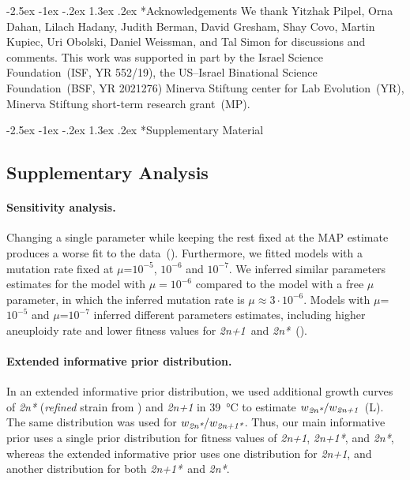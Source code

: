\documentclass[12pt]{extarticle}
\makeatletter
\renewcommand\section{\@startsection {section}{1}{\z@}%
     {-2.5ex \@plus -1ex \@minus -.2ex}%
     {1.3ex \@plus.2ex}%
    {\Large\bfseries}}
\newcommand{\anwt}{\emph{2n+1}}
\newcommand{\eumt}{\emph{2n*}}
\newcommand{\anmt}{\emph{2n+1*}}
\newcommand{\beginsupplement}{%
      	\setcounter{table}{0}
        \renewcommand{\thetable}{S\arabic{table}}%
        \setcounter{figure}{0}
        \renewcommand{\thefigure}{S\arabic{figure}}%
}
\makeatother
\begin{document}

{\small
\section*{Acknowledgements}
We thank Yitzhak Pilpel, Orna Dahan, Lilach Hadany, Judith Berman, David Gresham, Shay Covo, Martin Kupiec, Uri Obolski, Daniel Weissman, and Tal Simon for discussions and comments.
This work was supported in part by 
the Israel Science Foundation~(ISF, YR 552/19),
the US--Israel Binational Science Foundation~(BSF, YR 2021276)
Minerva Stiftung center for Lab Evolution~(YR),
Minerva Stiftung short-term research grant~(MP).
}




\newpage

\section*{Supplementary Material}
\beginsupplement %

\subsection*{Supplementary Analysis}
\label{sec:supp_analysis}

\paragraph{Sensitivity analysis.} 
Changing a single parameter while keeping the rest fixed at the MAP estimate produces a worse fit to the data~().
Furthermore, we fitted models with a mutation rate fixed at $\mu$=$10^{-5}$, $10^{-6}$ and $10^{-7}$.
We inferred similar parameters estimates for the model with $\mu=10^{-6}$ compared to the model with a free $\mu$ parameter, in which the inferred mutation rate is $\mu \approx 3\cdot10^{-6}$.
Models with $\mu$=$10^{-5}$ and $\mu$=$10^{-7}$ inferred different parameters estimates, including higher aneuploidy rate and lower fitness values for \anwt\ and \eumt~().

\paragraph{Extended informative prior distribution.}
In an extended informative prior distribution, we used additional growth curves of \eumt\; (\emph{refined} strain from \citet{Yona2012}) and \anwt\; in \SI{39}{\celsius} to estimate $w_{\eumt}/w_{\anwt}$~(L). The same distribution was used for $w_{\eumt}/w_{\anmt}$. 
Thus, our main informative prior uses a single prior distribution for fitness values of \anwt, \anmt, and \eumt, whereas the extended informative prior uses one distribution for \anwt, and another distribution for both \anmt\ and \eumt. 
\end{document}

